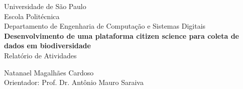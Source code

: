 \begin{titlepage}
  \begin{center}
    Universidade de São Paulo\\
    Escola Politécnica\\
    Departamento de Engenharia de Computação e Sistemas Digitais\\
    
    \vfill
    \large
    \textbf{Desenvolvimento de uma plataforma citizen science para coleta de dados em biodiversidade}\\
    \vspace{.6cm}
    Relatório de Atividades
    
    \vfill
    Natanael Magalhães Cardoso\\
    {\normalsize Orientador:} Prof. Dr. Antônio Mauro Saraiva
    \vspace{2cm}
  \end{center}
\end{titlepage}